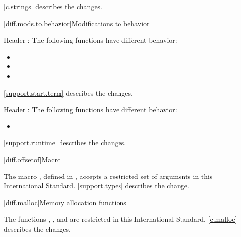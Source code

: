 \ref{c.strings} describes the changes.

[diff.mods.to.behavior]{Modifications to behavior}

\pnum
Header
:
The following functions have different behavior:
\begin{itemize}
\item
{}
\item
{}
\item
{}
\end{itemize}

\ref{support.start.term} describes the changes.

\pnum
Header
:
The following functions have different behavior:
\begin{itemize}
\item
{}
\end{itemize}

\ref{support.runtime} describes the changes.

[diff.offsetof]{Macro }
%

\pnum
The macro
,
defined in
%
,
accepts a restricted set of  arguments in this International Standard.
\ref{support.types} describes the change.

[diff.malloc]{Memory allocation functions}

\pnum
The functions
%
,
%
,
and
%
are restricted in this International Standard.
\ref{c.malloc} describes the changes.

